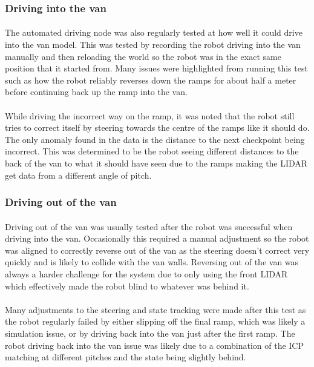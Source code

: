 \subsubsection{Driving into the van}
\paragraph{}
The automated driving node was also regularly tested at how well it could drive into the van model. This was tested by recording the robot driving into the van manually and then reloading the world so the robot was in the exact same position that it started from. Many issues were highlighted from running this test such as how the robot reliably reverses down the ramps for about half a meter before continuing back up the ramp into the van.

\paragraph{}
While driving the incorrect way on the ramp, it was noted that the robot still tries to correct itself by steering towards the centre of the ramps like it should do. The only anomaly found in the data is the distance to the next checkpoint being incorrect. This was determined to be the robot seeing different distances to the back of the van to what it should have seen due to the ramps making the LIDAR get data from a different angle of pitch.


\subsubsection{Driving out of the van}
\paragraph{}
Driving out of the van was usually tested after the robot was successful when driving into the van. Occasionally this required a manual adjustment so the robot was aligned to correctly reverse out of the van as the steering doesn't correct very quickly and is likely to collide with the van walls. Reversing out of the van was always a harder challenge for the system due to only using the front LIDAR which effectively made the robot blind to whatever was behind it.

\paragraph{}
Many adjustments to the steering and state tracking were made after this test as the robot regularly failed by either slipping off the final ramp, which was likely a simulation issue, or by driving back into the van just after the first ramp. The robot driving back into the van issue was likely due to a combination of the ICP matching at different pitches and the state being slightly behind.

